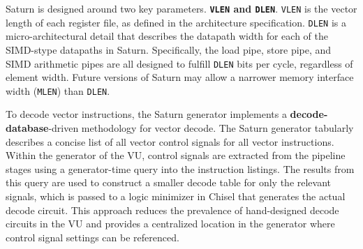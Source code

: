 Saturn is designed around two key parameters. \textbf{\texttt{VLEN} and \texttt{DLEN}}.
\texttt{VLEN} is the vector length of each register file, as defined in the architecture specification.
\texttt{DLEN} is a micro-architectural detail that describes the datapath width for each of the SIMD-stype datapaths in Saturn.
Specifically, the load pipe, store pipe, and SIMD arithmetic pipes are all designed to fulfill \texttt{DLEN} bits per cycle, regardless of element width.
Future versions of Saturn may allow a narrower memory interface width (\texttt{MLEN}) than \texttt{DLEN}.


To decode vector instructions, the Saturn generator implements a \textbf{decode-database}-driven methodology for vector decode.
The Saturn generator tabularly describes a concise list of all vector control signals for all vector instructions.
Within the generator of the VU, control signals are extracted from the pipeline stages using a generator-time query into the instruction listings.
The results from this query are used to construct a smaller decode table for only the relevant signals, which is passed to a logic minimizer in Chisel that generates the actual decode circuit.
This approach reduces the prevalence of hand-designed decode circuits in the VU and provides a centralized location in the generator where control signal settings can be referenced.
